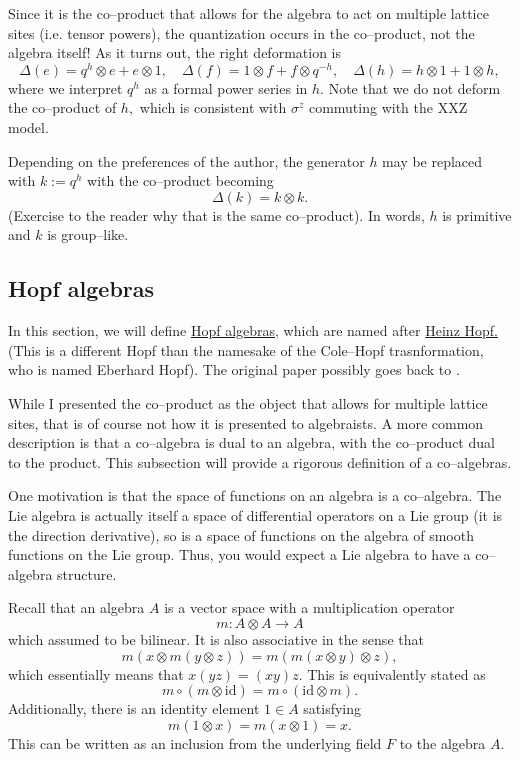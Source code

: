 \documentclass{ximera}
\begin{document}
Since it is the co--product that allows for the algebra to act on multiple lattice sites (i.e. tensor powers),
the quantization occurs in the co--product, not the algebra itself! As it turns out, the right deformation is
\[
\Delta(e) = q^h \otimes e + e \otimes 1, \quad \Delta(f) = 1 \otimes f + f \otimes q^{-h}, \quad \Delta(h)=h\otimes 1 + 1\otimes h,
\]
where we interpret \(q^h\) as a formal power series in \(h.\) Note that we do not deform the co--product
of \(h,\) which is consistent with \(\sigma^z\) commuting with the XXZ model. 

Depending on the preferences of the author, the generator \(h\) may be replaced with \(k:=q^h\) with 
the co--product becoming
\[
\Delta(k) = k \otimes k.
\]
(Exercise to the reader why that is the same co--product). In words, \(h\) is primitive and \(k\) is 
group--like.

\subsection{Hopf algebras}
In this section, we will define \href{https://en.wikipedia.org/wiki/Hopf_algebra}{Hopf algebras,} 
which are named after \href{https://en.wikipedia.org/wiki/Heinz_Hopf}{Heinz Hopf.} 
(This is a different Hopf than the namesake of the Cole--Hopf trasnformation, who is named
Eberhard Hopf). The original paper possibly goes back to \cite{Hop41}.

While I presented the co--product as the object that allows for multiple lattice sites, that is of 
course not how it is presented to algebraists. A more common description is that a co--algebra is
dual to an algebra, with the co--product dual to the product. This subsection will provide a rigorous
definition of a co--algebras.

One motivation is that the space of functions on an algebra is a co--algebra. The Lie algebra is
actually itself a space of differential operators on a Lie group (it is the direction derivative), 
so is a space of functions on the algebra of smooth functions on the Lie group. Thus, you would
expect a Lie algebra to have a co--algebra structure.


Recall that an algebra \(A\) is a vector space with a multiplication operator
\[
m: A \otimes A \rightarrow A   
\]
which assumed to be bilinear. It is also associative in the sense that
\[
m(x \otimes m(y \otimes z)) = m(m(x \otimes y) \otimes z),   
\]
which essentially means that \( x(yz) = (xy)z.\) This is equivalently stated as
\[
m \circ (m \otimes \mathrm{id})   = m \circ (\mathrm{id} \otimes m).
\]
Additionally, there is an identity element \(1 \in A\) satisfying
\[
m(1 \otimes x) = m(x \otimes 1) = x.   
\]
This can be written as an inclusion from the underlying field \(F\) to the algebra \(A.\)
\end{document}
